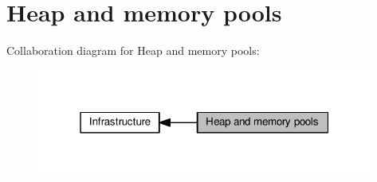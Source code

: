 \hypertarget{group__lwip__opts__mem}{}\section{Heap and memory pools}
\label{group__lwip__opts__mem}
Collaboration diagram for Heap and memory pools\+:
\nopagebreak
\begin{figure}[H]
\begin{center}
\leavevmode
\includegraphics[width=313pt]{group__lwip__opts__mem}
\end{center}
\end{figure}
